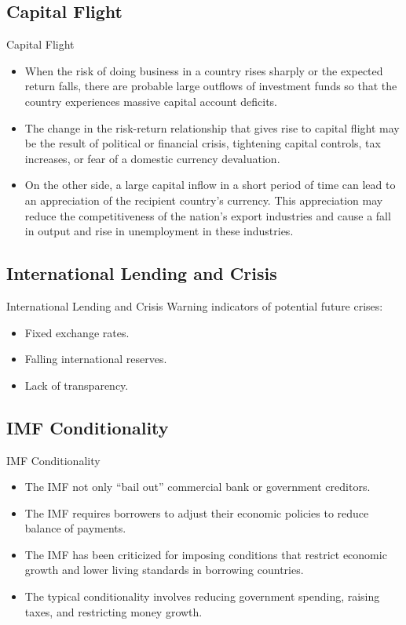 \documentclass[international_finance_p2.tex]{subfiles}
\begin{document}
\subsection{Capital Flight}
\begin{frame}[shrink=10]{Capital Flight}
\begin{itemize}[<+->]
\item
When the risk of doing business in a country rises sharply or the expected return falls, there are probable large outflows of investment funds so that the country experiences massive capital account deficits.
\item
The change in the risk-return relationship that gives rise to capital flight may be the result of political or financial crisis, tightening capital controls, tax increases, or fear of a domestic currency devaluation.
\item
On the other side, a large capital inflow in a short period of time can lead to an appreciation of the recipient country’s currency. This appreciation may reduce the competitiveness of the nation’s export industries and cause a fall in output and rise in unemployment in these industries.
\end{itemize}
\end{frame}

\subsection{International Lending and Crisis}
\begin{frame}{International Lending and Crisis}
Warning indicators of potential future crises:
\begin{itemize}[<+->]
\item
Fixed exchange rates.
\item
Falling international reserves.
\item
Lack of transparency.
\end{itemize}
\end{frame}

\subsection{IMF Conditionality}
\begin{frame}{IMF Conditionality}
\begin{itemize}[<+->]
\item
The IMF not only “bail out” commercial bank or government creditors. 
\item
The IMF requires borrowers to adjust their economic policies to reduce balance of payments.
\item
The IMF has been criticized for imposing conditions that restrict economic growth and lower living standards in borrowing countries. 
\item
The typical conditionality involves reducing government spending, raising taxes, and restricting money growth.
\end{itemize}
\end{frame}
\end{document}

